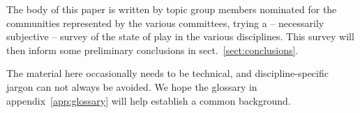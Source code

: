 \documentclass{article}
\begin{document}
The body of this paper is written by topic group members nominated for
the communities represented by the various committees, trying a --
necessarily subjective -- survey of the state of play in the various
disciplines.  This survey will then inform some preliminary conclusions
in sect.~\ref{sect:conclusions}.

The material here occasionally needs to be technical, and
discipline-specific jargon can not always be avoided.  We hope the
glossary in appendix~\ref{app:glossary} will help establish a common
background.



















\appendix


\end{document}
